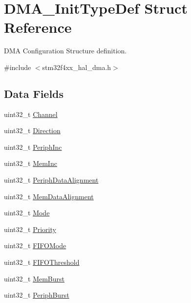 \hypertarget{struct_d_m_a___init_type_def}{}\section{D\+M\+A\+\_\+\+Init\+Type\+Def Struct Reference}
\label{struct_d_m_a___init_type_def}


D\+MA Configuration Structure definition.  




{\ttfamily \#include $<$stm32f4xx\+\_\+hal\+\_\+dma.\+h$>$}

\subsection*{Data Fields}
\begin{DoxyCompactItemize}
\item 
uint32\+\_\+t \hyperlink{struct_d_m_a___init_type_def_af62608eb25864208cae5d59acef282a6}{Channel}
\item 
uint32\+\_\+t \hyperlink{struct_d_m_a___init_type_def_a0145b5d0e074fa8e2e185ecf2c4a15ca}{Direction}
\item 
uint32\+\_\+t \hyperlink{struct_d_m_a___init_type_def_a46811eb656170cb5c542054d1a41db3a}{Periph\+Inc}
\item 
uint32\+\_\+t \hyperlink{struct_d_m_a___init_type_def_a49b187ba5ab8ba4354e02837e8b99414}{Mem\+Inc}
\item 
uint32\+\_\+t \hyperlink{struct_d_m_a___init_type_def_a10a4a549953efa20c235dcbb381b6f0b}{Periph\+Data\+Alignment}
\item 
uint32\+\_\+t \hyperlink{struct_d_m_a___init_type_def_a7784efedc4a61325fa7364fcace10136}{Mem\+Data\+Alignment}
\item 
uint32\+\_\+t \hyperlink{struct_d_m_a___init_type_def_adbbca090b53d32ac93cc7359b7994db2}{Mode}
\item 
uint32\+\_\+t \hyperlink{struct_d_m_a___init_type_def_af110cc02c840207930e3c0e5de5d7dc4}{Priority}
\item 
uint32\+\_\+t \hyperlink{struct_d_m_a___init_type_def_acda0396cf55baab166f51b1ea1deed0d}{F\+I\+F\+O\+Mode}
\item 
uint32\+\_\+t \hyperlink{struct_d_m_a___init_type_def_a2f994cc2979b82cd215e9f38edbbc6ed}{F\+I\+F\+O\+Threshold}
\item 
uint32\+\_\+t \hyperlink{struct_d_m_a___init_type_def_ad5e266a0b90f58365e21c349654bc68d}{Mem\+Burst}
\item 
uint32\+\_\+t \hyperlink{struct_d_m_a___init_type_def_a3fbfe4dd664e24845dc75f5c8f43b5a3}{Periph\+Burst}
\end{DoxyCompactItemize}


